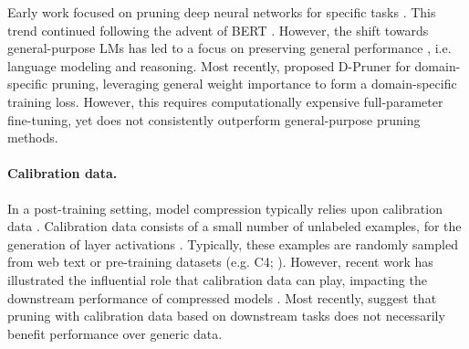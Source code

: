 Early work focused on pruning deep neural networks for specific tasks \citep{han-etal-2015-learning, molchanov-etal-2017-pruning}. This trend continued \citep{sanh-etal-2020-movement, lagunas-etal-2021-block, kwon-etal-2022-fast} following the advent of BERT \citep{devlin-etal-2019-bert}. However, the shift towards general-purpose LMs \citep{brown-etal-2020-language, dredze-etal-2024-academics} has led to a focus on preserving general performance \citep{frantar-alistarh-2023-sparsegpt, ma-etal-2023-llm, sun-etal-2024-simple}, i.e. language modeling and reasoning. Most recently, \citet{zhang-etal-2024-pruning} proposed D-Pruner for domain-specific pruning, leveraging general weight importance to form a domain-specific training loss. However, this requires computationally expensive full-parameter fine-tuning, yet does not consistently outperform general-purpose pruning methods.

\paragraph{Calibration data.}

In a post-training setting, model compression typically relies upon calibration data \citep{wan-etal-2024-efficient}. Calibration data consists of a small number of unlabeled examples, for the generation of layer activations \citep{nagel-etal-2020-up, hubara-etal-2021-accurate}. Typically, these examples are randomly sampled from web text or pre-training datasets (e.g. C4; \citealp{raffel-etal-2020-exploring}). However, recent work has illustrated the influential role that calibration data can play, impacting the downstream performance of compressed models \citep{williams-aletras-2024-impact}. Most recently, \citet{bandari-etal-2024-c4} suggest that pruning with calibration data based on downstream tasks does not necessarily benefit performance over generic data.